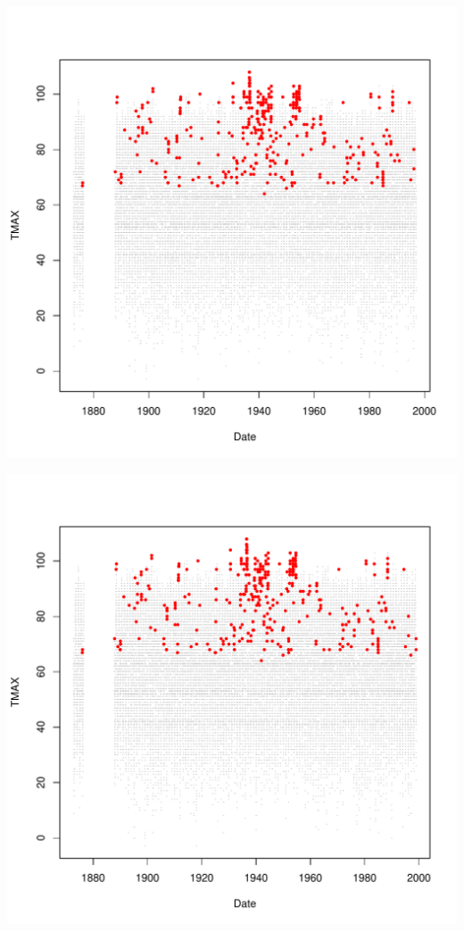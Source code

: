 \documentclass{article}\usepackage[]{graphicx}\usepackage[]{color}
\makeatletter
\def\maxwidth{ %
  \ifdim\Gin@nat@width>\linewidth
    \linewidth
  \else
    \Gin@nat@width
  \fi
}
\newenvironment{knitrout}{}{} %
\makeatother
\begin{document}
\begin{knitrout}
\includegraphics[width=\maxwidth]{figure/unnamed-chunk-4-58} 

\includegraphics[width=\maxwidth]{figure/unnamed-chunk-4-59} 


\end{knitrout}
\end{document}
